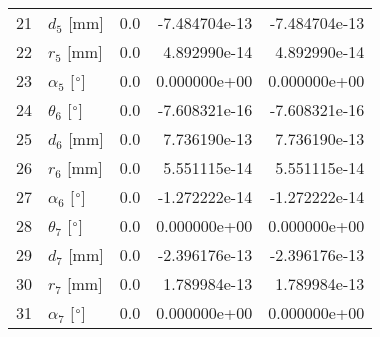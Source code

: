 \documentclass{standalone}%
\begin{document}
\begin{tabular}{llrrr}
21 &              $d_{5}$ [mm] &       0.0 & -7.484704e-13 & -7.484704e-13 \\
22 &              $r_{5}$ [mm] &       0.0 &  4.892990e-14 &  4.892990e-14 \\
23 &  $\alpha_{5}$ [$\degree$] &       0.0 &  0.000000e+00 &  0.000000e+00 \\
24 &  $\theta_{6}$ [$\degree$] &       0.0 & -7.608321e-16 & -7.608321e-16 \\
25 &              $d_{6}$ [mm] &       0.0 &  7.736190e-13 &  7.736190e-13 \\
26 &              $r_{6}$ [mm] &       0.0 &  5.551115e-14 &  5.551115e-14 \\
27 &  $\alpha_{6}$ [$\degree$] &       0.0 & -1.272222e-14 & -1.272222e-14 \\
28 &  $\theta_{7}$ [$\degree$] &       0.0 &  0.000000e+00 &  0.000000e+00 \\
29 &              $d_{7}$ [mm] &       0.0 & -2.396176e-13 & -2.396176e-13 \\
30 &              $r_{7}$ [mm] &       0.0 &  1.789984e-13 &  1.789984e-13 \\
31 &  $\alpha_{7}$ [$\degree$] &       0.0 &  0.000000e+00 &  0.000000e+00 \\
\bottomrule
\end{tabular}
%
\end{document}
